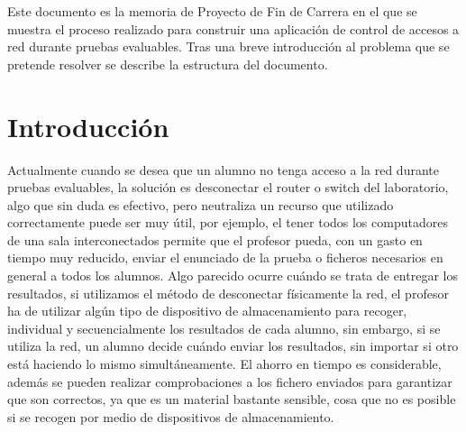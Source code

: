 


\label{chap:introduction}


Este documento es la memoria de Proyecto de Fin de Carrera en el que se muestra el proceso realizado para construir una aplicación de control de accesos a red durante pruebas evaluables. Tras una breve introducción al problema que se pretende resolver se describe la estructura del documento.

\chaptertoc

\section{Introducción}
\label{sec:intr:introduction}


Actualmente cuando se desea que un alumno no tenga acceso a la red durante pruebas evaluables, la solución es desconectar el router o switch del laboratorio, algo que sin duda es efectivo, pero neutraliza un recurso que utilizado correctamente puede ser muy útil, por ejemplo, el tener todos los computadores de una sala interconectados permite que el profesor pueda, con un gasto en tiempo muy reducido, enviar el enunciado de la prueba o ficheros necesarios en general a todos los alumnos. Algo parecido ocurre cuándo se trata de entregar los resultados, si utilizamos el método de desconectar físicamente la red, el profesor ha de utilizar algún tipo de dispositivo de almacenamiento para recoger, individual y secuencialmente los resultados de cada alumno, sin embargo, si se utiliza la red, un alumno decide cuándo enviar los resultados, sin importar si otro está haciendo lo mismo simultáneamente. El ahorro en tiempo es considerable, además se pueden realizar comprobaciones a los fichero enviados para garantizar que son correctos, ya que es un material bastante sensible, cosa que no es posible si se recogen por medio de dispositivos de almacenamiento.



